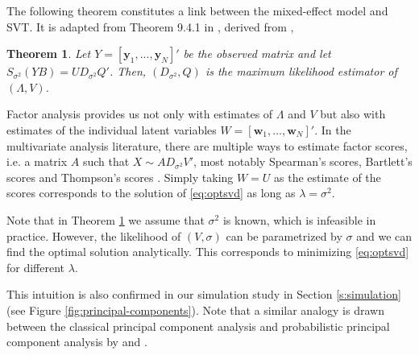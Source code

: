 \documentclass[preprint]{imsart}
\numberwithin{equation}{section}
\theoremstyle{plain}
\newtheorem{theorem}{Theorem}
\newcommand{\tr}[1]{{\textcolor{red}{#1}}}
\newcommand{\by}{\mathbf{y}}
\newcommand{\bw}{\mathbf{w}}
\begin{document}
The following theorem constitutes a link between the mixed-effect model and SVT. It is adapted from Theorem 9.4.1 in \citet{mardia1980multivariate}, derived from \citet{joreskog1967some}, 

\begin{theorem}\label{thm:maxlike}
  Let $Y = [\by_1,...,\by_N]'$ be the observed matrix and let $S_{\sigma^2}(YB) = UD_{\sigma^2}Q'$. Then, $(D_{\sigma^2},Q)$ is the maximum likelihood estimator of $(\Lambda,V)$.
\end{theorem}

Factor analysis provides us not only with estimates of $\Lambda$ and $V$ but also with estimates of the individual latent variables $W = [\bw_1,...,\bw_N]'$.
In the multivariate analysis literature, there are multiple ways to estimate factor scores, i.e. a matrix $A$ such that $X \sim AD_{\sigma^2}V'$, most notably Spearman's scores, Bartlett's scores and Thompson's scores \citep{kim1978factor}. %
Simply taking $W = U$ as the estimate of the scores corresponds to the solution of \eqref{eq:optsvd} as long as $\lambda = \sigma^2$.

Note that in Theorem \ref{thm:maxlike} we assume that $\sigma^2$ is known, which is infeasible in practice. However, the likelihood of $(V,\sigma)$ can be parametrized by $\sigma$ and we can find the optimal solution analytically. This corresponds to minimizing \eqref{eq:optsvd} for different $\lambda$.


This intuition is also confirmed in our simulation study in Section \ref{s:simulation} (see Figure \ref{fig:principal-components}). Note that a similar analogy is drawn between the classical principal component analysis and probabilistic principal component analysis by \citet{tipping1999probabilistic} and \citet{james2000principal}. 

\end{document}

